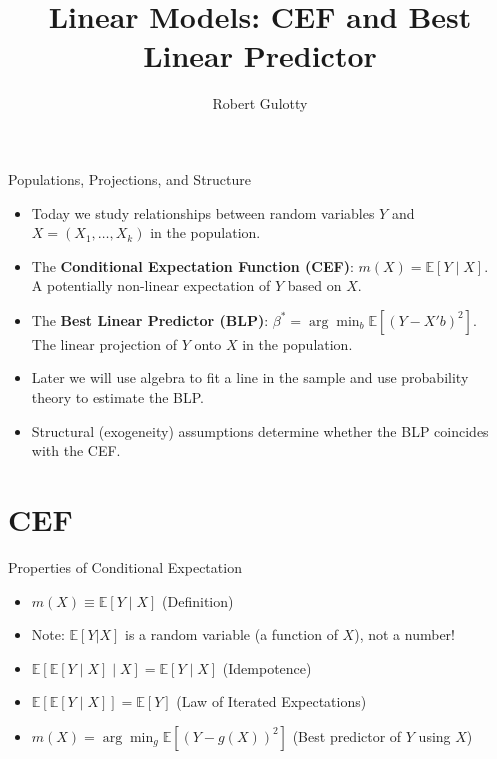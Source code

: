 \documentclass[aspectratio=169, handout, t]{beamer}
\title[PLSC 30700]{Linear Models: CEF and Best Linear Predictor}
\author{Robert Gulotty}
\institute[Chicago]{University of Chicago}
\numberwithin{equation}{section}
\begin{document}
\begin{frame}
\maketitle
\end{frame}


\begin{frame}{Populations, Projections, and Structure}
\begin{itemize}
\item Today we study relationships between random variables 
      $Y$ and $X = (X_1, \ldots, X_k)$ in the population.

\item The \textbf{Conditional Expectation Function (CEF)}:
      $m(X) = \mathbb{E}[Y \mid X]$.
      \\ \quad A potentially non-linear expectation of $Y$ based on $X$.

\item The \textbf{Best Linear Predictor (BLP)}:
      $\beta^* = \arg\min_b \mathbb{E}[(Y - X'b)^2]$.
      \\ \quad The linear projection of $Y$ onto $X$ in the population.

\item Later we will use algebra to fit a line in the sample and use probability theory to estimate the BLP.

\item Structural (exogeneity) assumptions determine whether the BLP coincides with the CEF.
\end{itemize}
\end{frame}




\section{CEF}

\begin{frame}{Properties of Conditional Expectation}
\begin{itemize}
  \item $m(X) \equiv \mathbb{E}[Y \mid X]$ \hfill (Definition)
  \item[*] Note: $\mathbb{E}[Y|X]$ is a random variable (a function of $X$), not a number!
  \bigskip
  \item $\mathbb{E}[\mathbb{E}[Y \mid X] \mid X] = \mathbb{E}[Y \mid X]$ \hfill (Idempotence)
  \bigskip
  \item $\mathbb{E}[\mathbb{E}[Y \mid X]] = \mathbb{E}[Y]$ \hfill (Law of Iterated Expectations)
  \bigskip
  \item $m(X) = \arg\min_{g} \mathbb{E}[(Y - g(X))^2]$ \hfill (Best predictor of $Y$ using $X$)

\end{itemize}
\end{frame}
\end{document}
